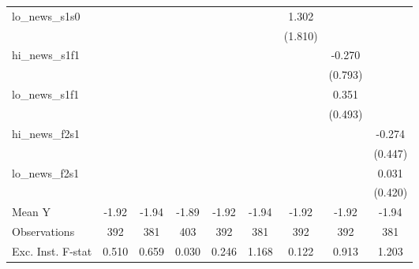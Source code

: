 {\begin{tabular}{l*{8}{c}}
\addlinespace
lo\_news\_s1s0&                     &                     &                     &                     &                     &       1.302         &                     &                     \\
            &                     &                     &                     &                     &                     &     (1.810)         &                     &                     \\
\addlinespace
hi\_news\_s1f1&                     &                     &                     &                     &                     &                     &      -0.270         &                     \\
            &                     &                     &                     &                     &                     &                     &     (0.793)         &                     \\
\addlinespace
lo\_news\_s1f1&                     &                     &                     &                     &                     &                     &       0.351         &                     \\
            &                     &                     &                     &                     &                     &                     &     (0.493)         &                     \\
\addlinespace
hi\_news\_f2s1&                     &                     &                     &                     &                     &                     &                     &      -0.274         \\
            &                     &                     &                     &                     &                     &                     &                     &     (0.447)         \\
\addlinespace
lo\_news\_f2s1&                     &                     &                     &                     &                     &                     &                     &       0.031         \\
            &                     &                     &                     &                     &                     &                     &                     &     (0.420)         \\
\midrule
Mean Y      &       -1.92         &       -1.94         &       -1.89         &       -1.92         &       -1.94         &       -1.92         &       -1.92         &       -1.94         \\
Observations&         392         &         381         &         403         &         392         &         381         &         392         &         392         &         381         \\
Exc. Inst. F-stat&       0.510         &       0.659         &       0.030         &       0.246         &       1.168         &       0.122         &       0.913         &       1.203         \\
\bottomrule
\end{tabular}
}
